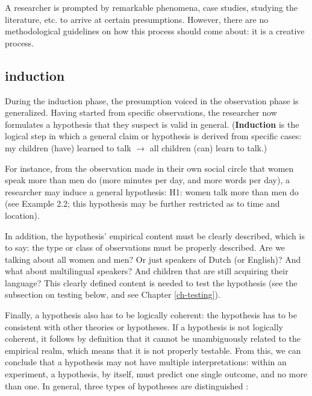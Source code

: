 \documentclass[
]{book}
\begin{document}
A researcher is prompted by remarkable phenomena, case studies, studying the literature, etc. to arrive at certain presumptions. However, there are no methodological guidelines on how this process should come about: it is a creative process.

\hypertarget{induction}{%
\subsection{induction}\label{induction}}

During the induction phase, the presumption voiced in the observation phase is generalized. Having started from specific observations, the researcher now formulates a hypothesis that they suspect is valid in general. (\textbf{Induction} is the logical step in which a general claim or hypothesis is derived from specific cases: my children (have) learned to talk \(\rightarrow\) all children (can) learn to talk.)

For instance, from the observation made in their own social circle that women speak more than men do (more minutes per day, and more words per day), a researcher may induce a general hypothesis: H1: women talk more than men do (see Example 2.2; this hypothesis may be further restricted as to time and location).

In addition, the hypothesis' empirical content must be clearly described, which is to say: the type or class of observations must be properly described. Are we talking about all women and men? Or just speakers of Dutch (or English)? And what about multilingual speakers? And children that are still acquiring their language? This clearly defined content is needed to test the hypothesis (see the subsection on testing below, and see Chapter \ref{ch-testing}).

Finally, a hypothesis also has to be logically coherent: the hypothesis has to be consistent with other theories or hypotheses. If a hypothesis is not logically coherent, it follows by definition that it cannot be unambiguously related to the empirical realm, which means that it is not properly testable. From this, we can conclude that a hypothesis may not have multiple interpretations: within an experiment, a hypothesis, by itself, must predict one single outcome, and no more than one.
In general, three types of hypotheses are distinguished \citep{Groot61}:
\end{document}

